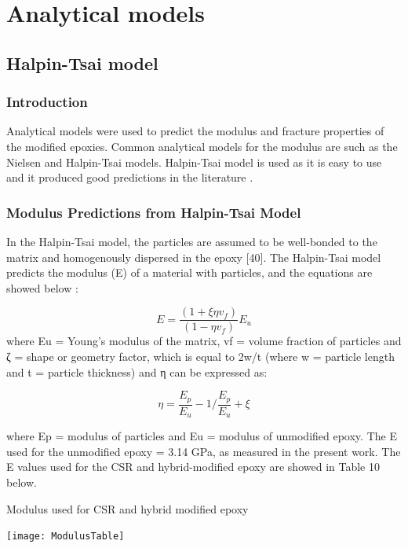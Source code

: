\documentclass[numbers=noendperiod,chapterprefix=on]{icldt} %
\begin{document}
\chapter{Analytical models}

\section{Halpin-Tsai model}

\subsection{Introduction}
Analytical models were used to predict the modulus and fracture properties of the modified epoxies. Common analytical models for the modulus are such as the Nielsen and Halpin-Tsai \cite{Hsieh2010a} models. Halpin-Tsai model is used as it is easy to use and it produced good predictions in the literature \cite{Giannakopoulos2011} .

\subsection{Modulus Predictions from Halpin-Tsai Model}
In the Halpin-Tsai model, the particles are assumed to be well-bonded to the matrix and homogenously dispersed in the epoxy [40]. The Halpin-Tsai model predicts the modulus (E) of a material with particles, and the equations are showed below \cite{Hsieh2010a,Hsieh2010,Giannakopoulos2011}:

\begin{equation} 
E=\frac{(1+\xi \eta v_f)}{(1-\eta v_f )} E_u
\end{equation}
where Eu = Young's modulus of the matrix, vf = volume fraction of particles and ζ = shape or geometry factor, which is equal to 2w/t (where w = particle length and t = particle thickness) and η can be expressed as:

\begin{equation} 
\eta=\frac{E_p}{E_u} -1/\frac{E_p}{E_u }+\xi
\end{equation}

where Ep = modulus of particles and Eu = modulus of unmodified epoxy. 
The E used for the unmodified epoxy = 3.14 GPa, as measured in the present work. The E values used for the CSR and hybrid-modified epoxy are showed in Table 10 below. 

\begin{table}[!htpb]
\centering
\caption{Modulus used for CSR and hybrid modified epoxy } %
\texttt{[image: ModulusTable]}
\end{table}
\FloatBarrier
\end{document}

